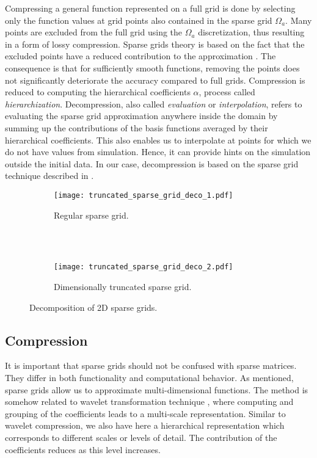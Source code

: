 Compressing a general function represented on a full grid is done by selecting
only the function values at grid points also contained in the sparse grid $\Omega_a$. 
Many points are excluded from the full grid using the $\Omega_a$ discretization,
thus resulting in a form of lossy compression. 
Sparse grids theory is based on the fact that the excluded points have a reduced
contribution to the approximation \cite{CambridgeJournals:227245}. The
consequence is that for sufficiently smooth functions, removing the points does
not significantly deteriorate the accuracy compared to full grids.
Compression is reduced to computing the hierarchical coefficients $\alpha$,
process called \textit{hierarchization}. Decompression, also called
\textit{evaluation} or \textit{interpolation}, refers to evaluating the sparse
grid approximation anywhere inside the domain by summing up the contributions of
the basis functions averaged by their hierarchical coefficients. This also
enables us to interpolate at points for which we do not have values from
simulation. Hence, it can provide hints on the simulation outside the initial
data. In our case, decompression is based on the sparse grid technique described
in \cite{CambridgeJournals:227245}.

\begin{figure}[t]
  \begin{subfigure}[b]{1\linewidth}
    \centering
    \texttt{[image: truncated\_sparse\_grid\_deco\_1.pdf]}
    \caption{Regular sparse grid.}
    \label{fig:truncated_sparse_grid_deco_1}
  \end{subfigure}
  \\ \\
  \begin{subfigure}[b]{1\linewidth}
    \centering
    \texttt{[image: truncated\_sparse\_grid\_deco\_2.pdf]}
    \caption{Dimensionally truncated sparse grid.}
    \label{fig:truncated_sparse_grid_deco_2}
  \end{subfigure}
  \caption{Decomposition of 2D sparse grids.}
  \label{fig:truncated_sparse_grid_deco}
\end{figure}

\subsection{Compression}

It is important that sparse grids should not be confused with sparse matrices.
They differ in both functionality and computational behavior. As mentioned,
sparse grids allow us to approximate multi-dimensional functions. The method is
somehow related to wavelet transformation technique \cite{Mallat89atheory},
where computing and grouping of the coefficients leads to a multi-scale representation. 
Similar to wavelet compression, we also have here a hierarchical representation which corresponds
to different scales or levels of detail. The contribution of the coefficients reduces as
this level increases.

